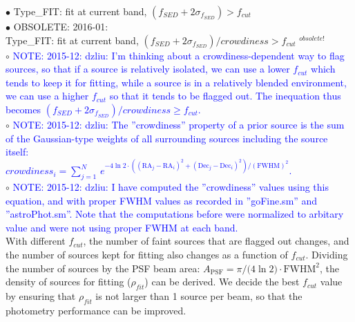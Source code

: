 \documentclass[11pt,a4paper]{article}
\begin{document}
\indent\hspace{15pt}$\bullet$ 
Type\_FIT: fit at current band, $(f_{SED}+2\sigma_{f_{SED}}) > f_{cut}$
\\
\textcolor{black!30!white}{
\indent\hspace{15pt}$\bullet$ 
OBSOLETE: 2016-01: \\
\indent\hspace{20pt}
Type\_FIT: fit at current band, $(f_{SED}+2\sigma_{f_{SED}})/crowdiness > f_{cut}$
$^{obsolete!}$
}
\\
\indent\hspace{15pt}$\circ$ 
\textcolor{blue}{NOTE: 2015-12: dzliu: I'm thinking about a crowdiness-dependent way to flag sources, so that if a source is relatively isolated, we can use a lower $f_{cut}$ which tends to keep it for fitting, while a source is in a relatively blended environment, we can use a higher $f_{cut}$ so that it tends to be flagged out. The inequation thus becomes $(f_{SED}+2\sigma_{f_{SED}})/crowdiness \ge f_{cut}$.}
\\
\indent\hspace{15pt}$\circ$ 
\textcolor{blue}{NOTE: 2015-12: dzliu: The ''crowdiness'' property of a prior source is the sum of the Gaussian-type weights of all surrounding sources including the source itself: 
\\
$crowdiness_{i} = \sum_{j=1}^{N} \, e^{-4\ln{2}\cdot\left((\mathrm{RA}_{j}-\mathrm{RA}_{i})^2+(\mathrm{Dec}_{j}-\mathrm{Dec}_{i})^2\right)/\left(\mathrm{FWHM}\right)^2}$. }
\\
\indent\hspace{15pt}$\circ$ 
\textcolor{blue}{NOTE: 2015-12: dzliu: I have computed the ''crowdiness'' values using this equation, and with proper FWHM values as recorded in ''goFine.sm'' and ''astroPhot.sm''. Note that the computations before were normalized to arbitary value and were not using proper FWHM at each band. }
\\

With different $f_{cut}$, the number of faint sources that are flagged out changes, and the number of sources kept for fitting also changes as a function of $f_{cut}$. Dividing the number of sources by the PSF beam area: $A_\mathrm{PSF}={\pi}/({4\ln{2})}\cdot\mathrm{FWHM}^2$, the density of sources for fitting ($\rho_{fit}$) can be derived. We decide the best $f_{cut}$ value by ensuring that  $\rho_{fit}$ is not larger than 1 source per beam, so that the photometry performance can be improved. 

\end{document}
